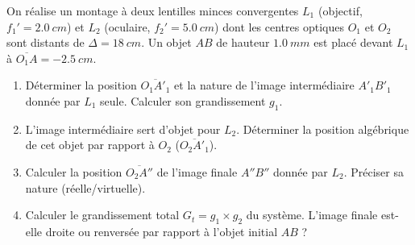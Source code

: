 \documentclass[11pt]{article}
\begin{document}
\begin{exercice}
On réalise un montage à deux lentilles minces convergentes $L_1$ (objectif, $f_1' = \SI{2,0}{cm}$) et $L_2$ (oculaire, $f_2' = \SI{5,0}{cm}$) dont les centres optiques $O_1$ et $O_2$ sont distants de $\Delta = \SI{18}{cm}$. Un objet $AB$ de hauteur $\SI{1,0}{mm}$ est placé devant $L_1$ à $\overline{O_1A} = \SI{-2,5}{cm}$.
\begin{enumerate}
    \item Déterminer la position $\overline{O_1A'_1}$ et la nature de l'image intermédiaire $A'_1B'_1$ donnée par $L_1$ seule. Calculer son grandissement $g_1$.
    \item L'image intermédiaire sert d'objet pour $L_2$. Déterminer la position algébrique de cet objet par rapport à $O_2$ ($\overline{O_2A'_1}$).
    \item Calculer la position $\overline{O_2A''}$ de l'image finale $A''B''$ donnée par $L_2$. Préciser sa nature (réelle/virtuelle).
    \item Calculer le grandissement total $G_t = g_1 \times g_2$ du système. L'image finale est-elle droite ou renversée par rapport à l'objet initial $AB$ ?
\end{enumerate}
\end{exercice}
\end{document}
